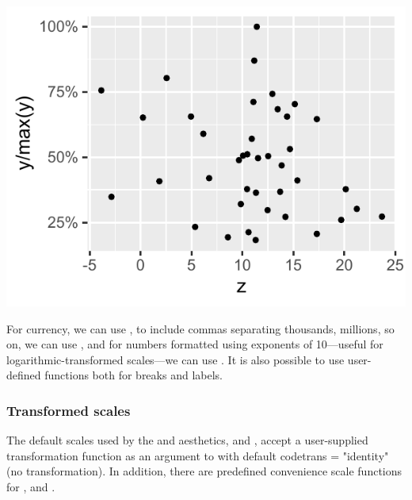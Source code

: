 \documentclass[krantz2]{krantz}\usepackage{knitr}
\begin{document}
\begin{knitrout}\footnotesize
{}\color{fgcolor}\begin{kframe}
\begin{alltt}
  \hlopt{/}  \hlopt{+}
  \hlstd{()} \hlopt{+}
  \hlstd{(} \hlopt{::}
\end{alltt}
\end{kframe}

{\centering \includegraphics[width=.54\textwidth]{figure/pos-scale-ticks-03-1} 

}



\end{knitrout}

For currency, we can use , to include commas separating thousands, millions, so on, we can use , and for numbers formatted using exponents of 10---useful for logarithmic-transformed scales---we can use . It is also possible to use user-defined functions both for breaks and labels.

\subsubsection{Transformed scales}\label{sec:plot:scales:trans}

The default scales used by the  and  aesthetics,  and , accept a user-supplied transformation function as an argument to  with default code{trans = "identity"} (no transformation). In addition, there are predefined convenience scale functions for ,  and .
\end{document}
